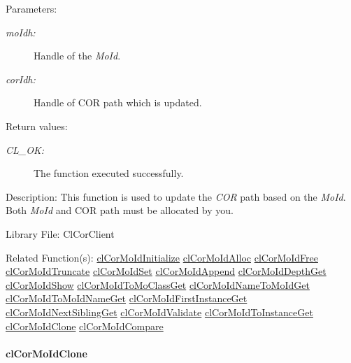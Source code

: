 \begin{Desc}
\item[Parameters:]
\begin{description}
\item[{\em mo\-Idh:}]Handle of the {\em Mo\-Id\/}. \item[{\em cor\-Idh:}]Handle of COR path which is updated.\end{description}
\end{Desc}
\begin{Desc}
\item[Return values:]
\begin{description}
\item[{\em CL\_\-OK:}]The function executed successfully.\end{description}
\end{Desc}
\begin{Desc}
\item[Description:]This function is used to update the {\em COR\/} path based on the {\em Mo\-Id\/}. Both {\em Mo\-Id\/} and COR path must be allocated by you.\end{Desc}
\begin{Desc}
\item[Library File:]Cl\-Cor\-Client\end{Desc}
\begin{Desc}
\item[Related Function(s):]\hyperlink{group__group13}{cl\-Cor\-Mo\-Id\-Initialize} \hyperlink{group__group13}{cl\-Cor\-Mo\-Id\-Alloc} \hyperlink{group__group13}{cl\-Cor\-Mo\-Id\-Free} \hyperlink{group__group13}{cl\-Cor\-Mo\-Id\-Truncate} \hyperlink{group__group13}{cl\-Cor\-Mo\-Id\-Set} \hyperlink{group__group13}{cl\-Cor\-Mo\-Id\-Append} \hyperlink{group__group13}{cl\-Cor\-Mo\-Id\-Depth\-Get} \hyperlink{group__group13}{cl\-Cor\-Mo\-Id\-Show} \hyperlink{group__group13}{cl\-Cor\-Mo\-Id\-To\-Mo\-Class\-Get} \hyperlink{group__group13}{cl\-Cor\-Mo\-Id\-Name\-To\-Mo\-Id\-Get} \hyperlink{group__group13}{cl\-Cor\-Mo\-Id\-To\-Mo\-Id\-Name\-Get} \hyperlink{group__group13}{cl\-Cor\-Mo\-Id\-First\-Instance\-Get} \hyperlink{group__group13}{cl\-Cor\-Mo\-Id\-Next\-Sibling\-Get} \hyperlink{group__group13}{cl\-Cor\-Mo\-Id\-Validate} \hyperlink{group__group13}{cl\-Cor\-Mo\-Id\-To\-Instance\-Get} \hyperlink{group__group13}{cl\-Cor\-Mo\-Id\-Clone} \hyperlink{group__group13}{cl\-Cor\-Mo\-Id\-Compare} \end{Desc}
\hypertarget{pagecor244}{}\paragraph{cl\-Cor\-Mo\-Id\-Clone}\label{pagecor244}
